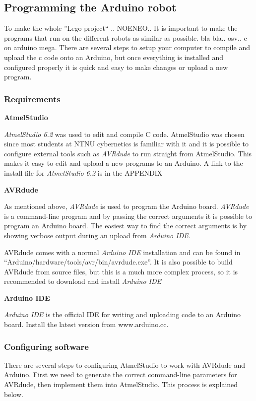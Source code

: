 \subsection{Programming the Arduino robot}
To make the whole ''Lego project`` .. NOENEO.. It is important to make the programs that run on the different robots as similar as possible. bla bla..  osv.. c on arduino mega. There are several steps to setup your computer to compile and upload the c code onto an Arduino, but once everything is installed and configured properly it is quick and easy to make changes or upload a new program.

\subsubsection{Requirements}
\textbf{AtmelStudio}



\textit{AtmelStudio 6.2} was used to edit and compile C code. AtmelStudio was chosen since most students at NTNU cybernetics is familiar with it and it is possible to configure external tools such as \textit{AVRdude} to run straight from AtmelStudio. This makes it easy to edit and upload a new programs to an Arduino. A link to the install file for \textit{AtmelStudio 6.2} is in the APPENDIX

\textbf{AVRdude}

As mentioned above, \textit{AVRdude} is used to program the Arduino board. \textit{AVRdude} is a command-line program and by passing the correct arguments it is possible to program an Arduino board. The easiest way to find the correct arguments is by showing verbose output during an upload from \textit{Arduino IDE}.

AVRdude comes with a normal \textit{Arduino IDE} installation and can be found in ``Arduino/hardware/tools/avr/bin/avrdude.exe''. It is also possible to build AVRdude from source files, but this is a much more complex process, so it is recommended to download and install \textit{Arduino IDE}

\textbf{Arduino IDE}

\textit{Arduino IDE} is the official IDE for writing and uploading code to an Arduino board. Install the latest version from www.arduino.cc.

\subsubsection{Configuring software}
There are several steps to configuring AtmelStudio to work with AVRdude and Arduino. First we need to generate the correct command-line parameters for AVRdude, then implement them into AtmelStudio. This process is explained below.

